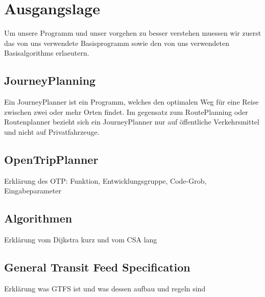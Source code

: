 \section{Ausgangslage}
Um unsere Programm und unser vorgehen zu besser verstehen muessen wir zuerst das von uns verwendete Basisprogramm sowie den von uns verwendeten Basisalgorithms erlaeutern.

\subsection{JourneyPlanning}
Ein JourneyPlanner ist ein Programm, welches den optimalen Weg für eine Reise zwischen zwei oder mehr Orten findet. Im gegensatz zum RoutePlanning oder Routenplanner bezieht sich ein JourneyPlanner nur auf öffentliche Verkehrsmittel und nicht auf Privatfahrzeuge.

\subsection{OpenTripPlanner}
Erklärung des OTP: Funktion, Entwicklungsgruppe, Code-Grob, Eingabeparameter

\subsection{Algorithmen}
Erklärung vom Dijkstra kurz und vom CSA lang

\subsection{General Transit Feed Specification}
Erklärung was GTFS ist und was dessen aufbau und regeln sind